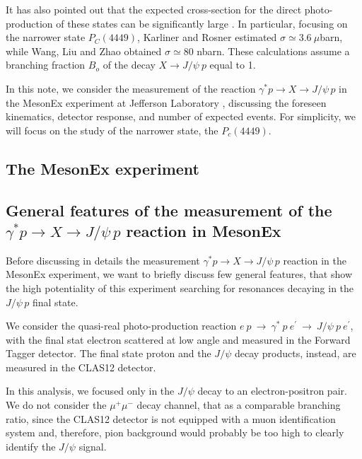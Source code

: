 \documentclass[a4paper,10pt]{article}
\begin{document}
It has also pointed out that the expected cross-section for the direct photo-production of these states can be significantly large \cite{Karliner:2015voa,Wang:2015jsa,Kubarovsky:2015aaa}. In particular, focusing on the narrower state $P_C(4449)$, Karliner and Rosner \cite{Karliner:2015voa} estimated $\sigma \simeq 3.6~\mu$barn, while Wang, Liu and Zhao \cite{Wang:2015jsa} obtained  $\sigma \simeq 80$ nbarn. These calculations assume a branching fraction $B_o$ of the decay $X \rightarrow J/\psi~p$ equal to 1.

In this note, we consider the measurement of the reaction $\gamma^* p \rightarrow X \rightarrow J/\psi \, p$ in the MesonEx experiment at Jefferson Laboratory \cite{MesonEx}, discussing the foreseen kinematics, detector response, and number of expected events. For simplicity, we will focus on the study of the narrower state, the $P_c(4449)$.

\subsection{The MesonEx experiment}

\subsection{General features of the measurement of the $\gamma^* p \rightarrow X \rightarrow J/\psi \, p$ reaction in MesonEx}

Before discussing in details the measurement $\gamma^* p \rightarrow X \rightarrow J/\psi \, p$ reaction in the MesonEx experiment, we want to briefly discuss few general features, that show the high potentiality of this experiment searching for resonances decaying in the $J/\psi\, p$ final state. 

We consider the quasi-real photo-production reaction $e~p~\rightarrow~\gamma^*~p~e^{\prime}~\rightarrow~J/\psi~p~e^{\prime}$, with the final stat electron scattered at low angle and measured in the Forward Tagger detector. The final state proton and the $J/\psi$ decay products, instead, are measured in the CLAS12 detector.

In this analysis, we focused only in the $J/\psi$ decay to an electron-positron pair. We do not consider the $\mu^+ \mu^-$ decay channel, that as a comparable branching ratio, since the CLAS12 detector is not equipped with a muon identification system and, therefore, pion background would probably be too high to clearly identify the $J/\psi$ signal.
\end{document}
